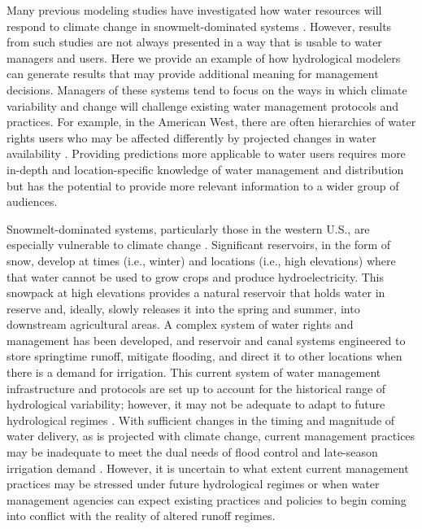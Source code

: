 \documentclass[11pt,letterpaper]{article}
\begin{document}
Many previous modeling studies have investigated how water resources will respond to climate change in snowmelt-dominated systems \citep{Adam:2009ie, Jin:2011ii, Ficklin:2013js, Gergel:2017vj}. However, results from such studies are not always presented in a way that is usable to water managers and users. Here we provide an example of how hydrological modelers can generate results that may provide additional meaning for management decisions. Managers of these systems tend to focus on the ways in which climate variability and change will challenge existing water management protocols and practices. For example, in the American West, there are often hierarchies of water rights users who may be affected differently by projected changes in water availability \citep{Vicuna:2007gj}. Providing predictions more applicable to water users requires more in-depth and location-specific knowledge of water management and distribution but has the potential to provide more relevant information to a wider group of audiences. 

Snowmelt-dominated systems, particularly those in the western U.S., are especially vulnerable to climate change \citep{Barnett:2005ci,Stewart:2009jn,Li:2017jn}. Significant reservoirs, in the form of snow, develop at times (i.e., winter) and locations (i.e., high elevations) where that water cannot be used to grow crops and produce hydroelectricity. This snowpack at high elevations provides a natural reservoir that holds water in reserve and, ideally, slowly releases it into the spring and summer, into downstream agricultural areas. A complex system of water rights and management has been developed, and reservoir and canal systems engineered to store springtime runoff, mitigate flooding, and direct it to other locations when there is a demand for irrigation. This current system of water management infrastructure and protocols are set up to account for the historical range of hydrological variability; however, it may not be adequate to adapt to future hydrological regimes \citep{Palmer:2008dv}. With sufficient changes in the timing and magnitude of water delivery, as is projected with climate change, current management practices may be inadequate to meet the dual needs of flood control and late-season irrigation demand \citep{Barnett:2005ci}. However, it is uncertain to what extent current management practices may be stressed under future hydrological regimes or when water management agencies can expect existing practices and policies to begin coming into conflict with the reality of altered runoff regimes. 
\end{document}
